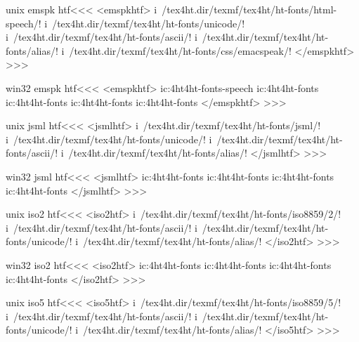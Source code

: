 \documentclass{article}
\begin{document}
\<unix emspk htf\><<<
<emspkhtf>
i~/tex4ht.dir/texmf/tex4ht/ht-fonts/html-speech/!
i~/tex4ht.dir/texmf/tex4ht/ht-fonts/unicode/!
i~/tex4ht.dir/texmf/tex4ht/ht-fonts/ascii/!
i~/tex4ht.dir/texmf/tex4ht/ht-fonts/alias/!
i~/tex4ht.dir/texmf/tex4ht/ht-fonts/css/emacspeak/!
</emspkhtf>
>>>



\<win32 emspk htf\><<<
<emspkhtf>
ic:\tex4ht\texmf\tex4ht\ht-fonts\html-speech\!
ic:\tex4ht\texmf\tex4ht\ht-fonts\unicode\!
ic:\tex4ht\texmf\tex4ht\ht-fonts\ascii\!
ic:\tex4ht\texmf\tex4ht\ht-fonts\alias\!
ic:\tex4ht\texmf\tex4ht\ht-fonts\css\emacspeak\!
</emspkhtf>
>>>






















\<unix jsml htf\><<<
<jsmlhtf>
i~/tex4ht.dir/texmf/tex4ht/ht-fonts/jsml/!
i~/tex4ht.dir/texmf/tex4ht/ht-fonts/unicode/!
i~/tex4ht.dir/texmf/tex4ht/ht-fonts/ascii/!
i~/tex4ht.dir/texmf/tex4ht/ht-fonts/alias/!
</jsmlhtf>
>>>



\<win32 jsml htf\><<<
<jsmlhtf>
ic:\tex4ht\texmf\tex4ht\ht-fonts\jsml\!
ic:\tex4ht\texmf\tex4ht\ht-fonts\unicode\!
ic:\tex4ht\texmf\tex4ht\ht-fonts\ascii\!
ic:\tex4ht\texmf\tex4ht\ht-fonts\alias\!
</jsmlhtf>
>>>






\<unix iso2 htf\><<<
<iso2htf>
i~/tex4ht.dir/texmf/tex4ht/ht-fonts/iso8859/2/!
i~/tex4ht.dir/texmf/tex4ht/ht-fonts/ascii/!
i~/tex4ht.dir/texmf/tex4ht/ht-fonts/unicode/!
i~/tex4ht.dir/texmf/tex4ht/ht-fonts/alias/!
</iso2htf>
>>>


\<win32 iso2 htf\><<<
<iso2htf>
ic:\tex4ht\texmf\tex4ht\ht-fonts\2\!
ic:\tex4ht\texmf\tex4ht\ht-fonts\ascii\!
ic:\tex4ht\texmf\tex4ht\ht-fonts\alias\!
ic:\tex4ht\texmf\tex4ht\ht-fonts\unicode\!
</iso2htf>
>>>









\<unix iso5 htf\><<<
<iso5htf>
i~/tex4ht.dir/texmf/tex4ht/ht-fonts/iso8859/5/!
i~/tex4ht.dir/texmf/tex4ht/ht-fonts/ascii/!
i~/tex4ht.dir/texmf/tex4ht/ht-fonts/unicode/!
i~/tex4ht.dir/texmf/tex4ht/ht-fonts/alias/!
</iso5htf>
>>>
\end{document}
